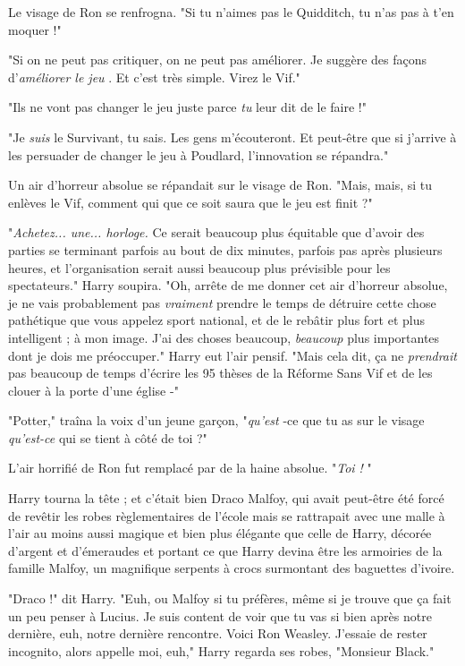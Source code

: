 Le visage de Ron se renfrogna. "Si tu n'aimes pas le Quidditch, tu n'as pas à t'en moquer !"

"Si on ne peut pas critiquer, on ne peut pas améliorer. Je suggère des façons d'\emph{améliorer le jeu} . Et c'est très simple. Virez le Vif."

"Ils ne vont pas changer le jeu juste parce \emph{tu}  leur dit de le faire !"

"Je \emph{suis}  le Survivant, tu sais. Les gens m'écouteront. Et peut-être que si j'arrive à les persuader de changer le jeu à Poudlard, l'innovation se répandra."

Un air d'horreur absolue se répandait sur le visage de Ron. "Mais, mais, si tu enlèves le Vif, comment qui que ce soit saura que le jeu est finit ?"

"\emph{Achetez... une... horloge.}  Ce serait beaucoup plus équitable que d'avoir des parties se terminant parfois au bout de dix minutes, parfois pas après plusieurs heures, et l'organisation serait aussi beaucoup plus prévisible pour les spectateurs." Harry soupira. "Oh, arrête de me donner cet air d'horreur absolue, je ne vais probablement pas \emph{vraiment}  prendre le temps de détruire cette chose pathétique que vous appelez sport national, et de le rebâtir plus fort et plus intelligent ; à mon image. J'ai des choses beaucoup, \emph{beaucoup}  plus importantes dont je dois me préoccuper." Harry eut l'air pensif. "Mais cela dit, ça ne \emph{prendrait}  pas beaucoup de temps d'écrire les 95 thèses de la Réforme Sans Vif et de les clouer à la porte d'une église -"

"Potter," traîna la voix d'un jeune garçon, "\emph{qu'est} -ce que tu as sur le visage \emph{qu'est-ce}  qui se tient à côté de toi ?"

L'air horrifié de Ron fut remplacé par de la haine absolue. "\emph{Toi !} "

Harry tourna la tête ; et c'était bien Draco Malfoy, qui avait peut-être été forcé de revêtir les robes règlementaires de l'école mais se rattrapait avec une malle à l'air au moins aussi magique et bien plus élégante que celle de Harry, décorée d'argent et d'émeraudes et portant ce que Harry devina être les armoiries de la famille Malfoy, un magnifique serpents à crocs surmontant des baguettes d'ivoire.

"Draco !" dit Harry. "Euh, ou Malfoy si tu préfères, même si je trouve que ça fait un peu penser à Lucius. Je suis content de voir que tu vas si bien après notre dernière, euh, notre dernière rencontre. Voici Ron Weasley. J'essaie de rester incognito, alors appelle moi, euh," Harry regarda ses robes, "Monsieur Black."


